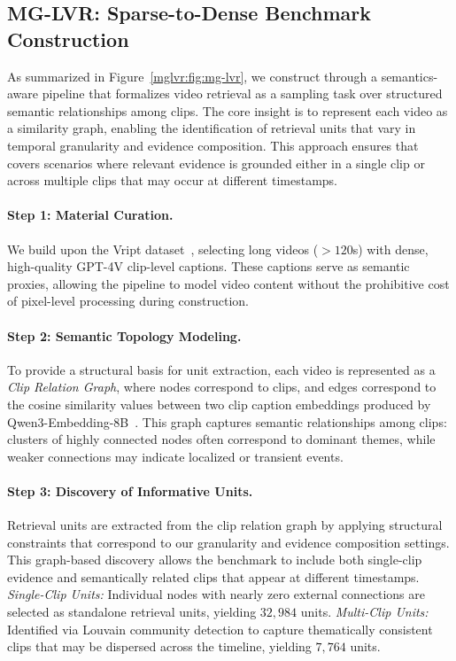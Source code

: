 \subsection{MG-LVR: Sparse-to-Dense Benchmark Construction}
\label{mglvr:sec:construction}

As summarized in Figure~\ref{mglvr:fig:mg-lvr}, we construct \benchmarkname through a semantics-aware pipeline that formalizes video retrieval as a sampling task over structured semantic relationships among clips. The core insight is to represent each video as a similarity graph, enabling the identification of retrieval units that vary in temporal granularity and evidence composition. This approach ensures that \benchmarkname covers scenarios where relevant evidence is grounded either in a single clip or across multiple clips that may occur at different timestamps.

\paragraph{Step 1: Material Curation.}
We build upon the Vript dataset~\cite{yang2024vript}, selecting long videos ($>120$s) with dense, high-quality GPT-4V clip-level captions. These captions serve as semantic proxies, allowing the pipeline to model video content without the prohibitive cost of pixel-level processing during construction.

\paragraph{Step 2: Semantic Topology Modeling.}
To provide a structural basis for unit extraction, each video is represented as a \textit{Clip Relation Graph}, where nodes correspond to clips, and edges correspond to the cosine similarity values between two clip caption embeddings produced by Qwen3-Embedding-8B~\cite{qwen3embedding}. This graph captures semantic relationships among clips: clusters of highly connected nodes often correspond to dominant themes, while weaker connections may indicate localized or transient events.

\paragraph{Step 3: Discovery of Informative Units.}
Retrieval units are extracted from the clip relation graph by applying structural constraints that correspond to our granularity and evidence composition settings. This graph-based discovery allows the benchmark to include both single-clip evidence and semantically related clips that appear at different timestamps.
\textit{Single-Clip Units:} Individual nodes with nearly zero external connections are selected as standalone retrieval units, yielding $32,984$ units.
\textit{Multi-Clip Units:} Identified via Louvain community detection to capture thematically consistent clips that may be dispersed across the timeline, yielding $7,764$ units.

